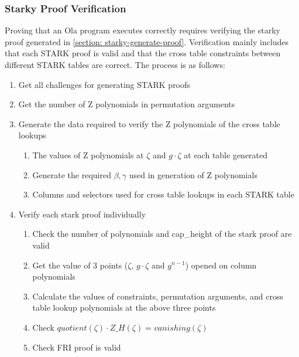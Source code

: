 \subsubsection{Starky Proof Verification}\label{section: starky-verify-proof}

Proving that an Ola program executes correctly requires verifying the starky proof generated in \ref{section: starky-generate-proof}. Verification mainly includes that each STARK proof is valid and that the cross table constraints between different STARK tables are correct. The process is as follows:

\begin{enumerate}
    \item Get all challenges for generating STARK proofs
    \item Get the number of Z polynomials  in permutation arguments
    \item Generate the data required to verify the Z polynomials of the cross table lookups
        \begin{enumerate}
            \item The values of Z polynomials at $\zeta$ and $g \cdot \zeta$ at each table generated
            \item Generate the required $\beta, \gamma$ used in generation of Z polynomials
            \item Columns and selectors used for cross table lookups in each STARK table
        \end{enumerate}
    \item Verify each stark proof individually
        \begin{enumerate}
            \item Check the number of polynomials and cap\_height of the stark proof are valid
            \item Get the value of 3 points ($\zeta$, $g \cdot \zeta$ and $g^{n-1}$) opened on column polynomials
            \item Calculate the values of constraints, permutation arguments, and cross table lookup polynomials at the above three points
            \item Check $quotient(\zeta) \cdot Z\_H(\zeta) = vanishing(\zeta)$
            \item Check FRI proof is valid
        \end{enumerate}
\end{enumerate}
